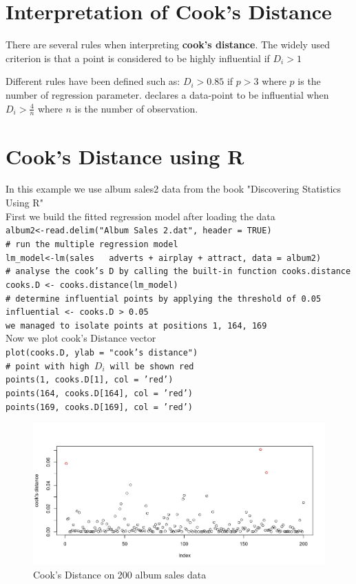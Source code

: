 \documentclass{article}[20pt]
\begin{document}
\section{Interpretation of Cook's Distance}
There are several rules when interpreting {\bf cook's distance}. The widely used criterion is that a point is considered to be highly influential if $D_i > 1$ \citep{weisberg}

Different rules have  been defined such as: $D_i > 0.85$ if $p > 3$ \citep{barry}   where $p$ is the number of regression parameter. \citep{Robert} declares a data-point to be influential when $D_i > \frac{4}{n}$ where $n$ is the number of observation.
\section{Cook's Distance using R}
In this example we use album sales2 data from the book "Discovering Statistics Using R" \citep{DSUR}\\
First we build the fitted regression model after loading the data \\
\texttt{album2<-read.delim("Album Sales 2.dat", header = TRUE)\\
\# run the multiple regression model\\
lm\_model<-lm(sales ~ adverts + airplay + attract, data = album2)\\
\# analyse the cook's D by calling the built-in function cooks.distance\\
cooks.D <- cooks.distance(lm\_model)\\
\# determine influential points by applying the threshold of 0.05 \\
influential <- cooks.D > 0.05\\
we managed to isolate points at positions 1, 164, 169}\\
Now we plot cook's Distance vector\\
\texttt{plot(cooks.D, ylab = "cook's distance")\\
\# point with high $D_i$ will be shown red\\ 
points(1, cooks.D[1], col = 'red') \\
points(164, cooks.D[164], col = 'red')\\
points(169, cooks.D[169], col = 'red')}
\begin{figure}[]
\begin{center}
\includegraphics[width=\linewidth]{cooksd}
\end{center}
\caption{Cook's Distance on 200 album sales data}

\label{fig:figure1}
\end{figure}
\end{document}
